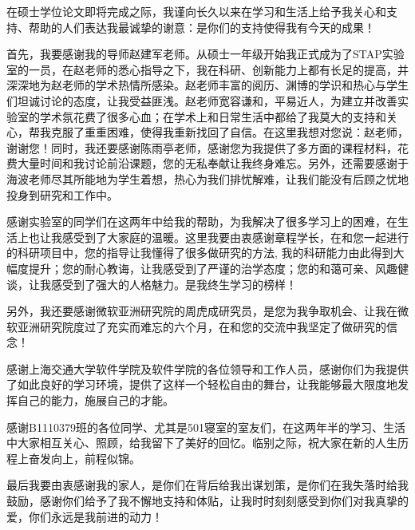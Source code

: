 \begin{thanks}
在硕士学位论文即将完成之际，我谨向长久以来在学习和生活上给予我关心和支持、帮助的人们表达我最诚挚的谢意：是你们的支持使得我有今天的成果！

首先，我要感谢我的导师赵建军老师。从硕士一年级开始我正式成为了STAP实验室的一员，在赵老师的悉心指导之下，我在科研、创新能力上都有长足的提高，并深深地为赵老师的学术热情所感染。赵老师丰富的阅历、渊博的学识和热心与学生们坦诚讨论的态度，让我受益匪浅。赵老师宽容谦和，平易近人，为建立并改善实验室的学术氛花费了很多心血；在学术上和日常生活中都给了我莫大的支持和关心，帮我克服了重重困难，使得我重新找回了自信。在这里我想对您说：赵老师，谢谢您！同时，我还要感谢陈雨亭老师，感谢您为我提供了多方面的课程材料，花费大量时间和我讨论前沿课题，您的无私奉献让我终身难忘。另外，还需要感谢于海波老师尽其所能地为学生着想，热心为我们排忧解难，让我们能没有后顾之忧地投身到研究和工作中。

感谢实验室的同学们在这两年中给我的帮助，为我解决了很多学习上的困难，在生活上也让我感受到了大家庭的温暖。这里我要由衷感谢章程学长，在和您一起进行的科研项目中，您的指导让我懂得了很多做研究的方法, 我的科研能力由此得到大幅度提升；您的耐心教诲，让我感受到了严谨的治学态度；您的和蔼可亲、风趣健谈，让我感受到了强大的人格魅力。是我终生学习的榜样！

另外，我还要感谢微软亚洲研究院的周虎成研究员，是您为我争取机会、让我在微软亚洲研究院度过了充实而难忘的六个月，在和您的交流中我坚定了做研究的信念！

感谢上海交通大学软件学院及软件学院的各位领导和工作人员，感谢你们为我提供了如此良好的学习环境，提供了这样一个轻松自由的舞台，让我能够最大限度地发挥自己的能力，施展自己的才能。

感谢B1110379班的各位同学、尤其是501寝室的室友们，在这两年半的学习、生活中大家相互关心、照顾，给我留下了美好的回忆。临别之际，祝大家在新的人生历程上奋发向上，前程似锦。

最后我要由衷感谢我的家人，是你们在背后给我出谋划策，是你们在我失落时给我鼓励，感谢你们给予了我不懈地支持和体贴，让我时时刻刻感受到你们对我真挚的爱，你们永远是我前进的动力！
\end{thanks}
